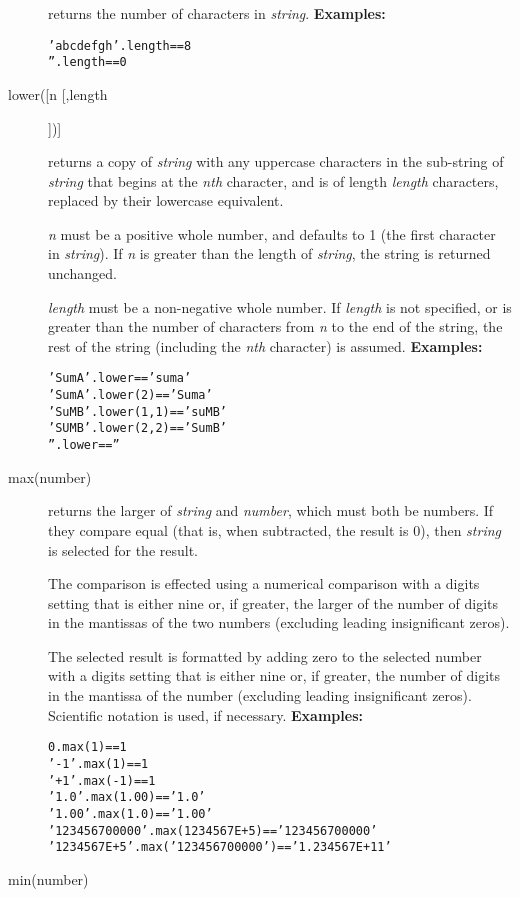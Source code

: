 \begin{description}
returns the number of characters in \emph{string}.
 \textbf{Examples:}
\begin{alltt}
'abcdefgh'.length == 8
''.length         == 0
\end{alltt}
\item[lower([n [,length]])]\label{reflower}

returns a copy of \emph{string} with any uppercase characters in
the sub-string of \emph{string} that begins at the \emph{n}\emph{th}
character, and is of length \emph{length} characters, replaced by
their lowercase equivalent.
 
\emph{n} must be a positive whole number, and defaults to 1 (the
first character in \emph{string}).  If \emph{n} is greater than
the length of \emph{string}, the string is returned unchanged.
 
\emph{length} must be a non-negative whole number.
If \emph{length} is not specified, or is greater than the number of
characters from \emph{n} to the end of the string, the rest of the
string (including the \emph{n}\emph{th} character) is assumed.
 \textbf{Examples:}
\begin{alltt}
'SumA'.lower      == 'suma'
'SumA'.lower(2)   == 'Suma'
'SuMB'.lower(1,1) == 'suMB'
'SUMB'.lower(2,2) == 'SumB'
''.lower          == ''
\end{alltt}
\item[max(number)]\label{refmax}

returns the larger of \emph{string} and \emph{number}, which
must both be numbers.  If they compare equal (that is, when subtracted,
the result is 0), then \emph{string} is selected for the result.
 
The comparison is effected using a numerical comparison with a digits
setting that is either nine or, if greater, the larger of the number of
digits in the mantissas of the two numbers (excluding leading
insignificant zeros).
 
The selected result is formatted by adding zero to the selected number
with a digits setting that is either nine or, if greater, the number of
digits in the mantissa of the number (excluding leading insignificant
zeros).
Scientific notation is used, if necessary.
 \textbf{Examples:}
\begin{alltt}
0.max(1)          ==1
'-1'.max(1)       ==1
'+1'.max(-1)      ==1
'1.0'.max(1.00)   =='1.0'
'1.00'.max(1.0)   =='1.00'
'123456700000'.max(1234567E+5)   == '123456700000'
'1234567E+5'.max('123456700000') == '1.234567E+11'
\end{alltt}
\item[min(number)]\label{refmin}


\end{description}
